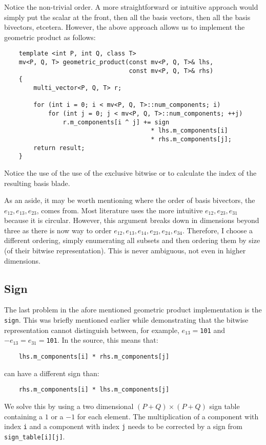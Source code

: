 \documentclass[10pt]{article}
\begin{document}
Notice the non-trivial order. A more straightforward or intuitive
approach would simply put the scalar at the front, then all the
basis vectors, then all the basis bivectors, etcetera. However,
the above approach allows us to implement the geometric product as
follows:

\begin{verbatim}
    template <int P, int Q, class T>
    mv<P, Q, T> geometric_product(const mv<P, Q, T>& lhs,
                                  const mv<P, Q, T>& rhs)
    {
        multi_vector<P, Q, T> r;

        for (int i = 0; i < mv<P, Q, T>::num_components; i)
            for (int j = 0; j < mv<P, Q, T>::num_components; ++j)
                r.m_components[i ^ j] += sign
                                        * lhs.m_components[i]
                                        * rhs.m_components[j];
        return result;
    }
\end{verbatim}

Notice the use of the use of the exclusive bitwise or to calculate the index of the resulting basis blade.

As an aside, it may be worth mentioning where the order of basis bivectors, the $e_{12}, e_{13}, e_{23}$, comes from. Most literature uses the more intuitive $e_{12}, e_{23}, e_{31}$ because it is circular. However, this argument breaks down in dimensions beyond three as there is now way to order $e_{12}, e_{13}, e_{14}, e_{23}, e_{24}, e_{34}$. Therefore, I choose a different ordering, simply enumerating all subsets and then ordering them by size (of their bitwise representation). This is never ambiguous, not even in higher dimensions.

\subsection{Sign}

The last problem in the afore mentioned geometric product implementation is the \verb"sign". This was briefly mentioned earlier while demonstrating that the bitwise representation cannot distinguish between, for example, $e_{13} =$\verb"101" and $-e_{13} = e_{31} =$\verb"101". In the source, this means that:
\begin{verbatim}
    lhs.m_components[i] * rhs.m_components[j]
\end{verbatim}
can have a different sign than:
\begin{verbatim}
    rhs.m_components[i] * lhs.m_components[j]
\end{verbatim}
We solve this by using a two dimensional $(P+Q)\times(P+Q)$ sign table containing a $1$ or a $-1$ for each element. The multiplication of a component with index \verb"i" and a component with index \verb"j" needs to be corrected by a sign from \verb"sign_table[i][j]".
\end{document}
